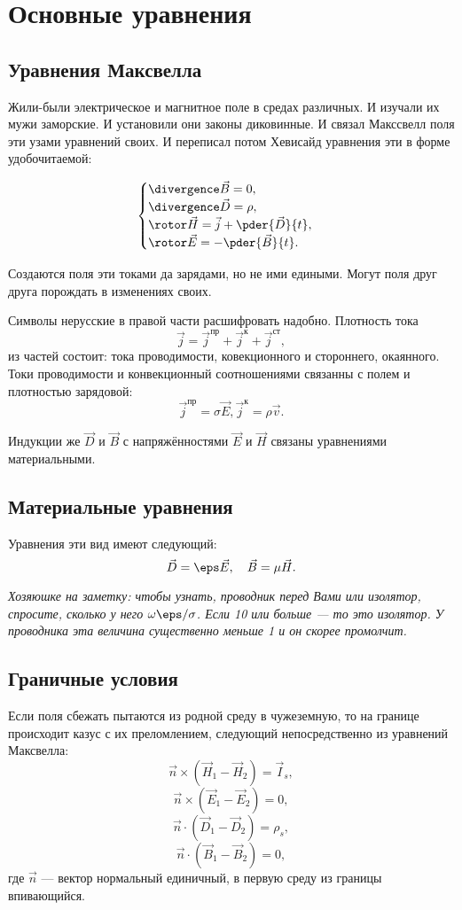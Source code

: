 \chapter{Основные уравнения}
\section{Уравнения Максвелла}
  Жили-были электрическое и магнитное поле в средах различных. И изучали их мужи
  заморские. И установили они законы диковинные. И связал Макссвелл поля эти
  узами уравнений своих. И переписал потом Хевисайд уравнения эти в форме
  удобочитаемой:

  \[
    \begin{cases}
      \divergence\vec{B} = 0,\\
      \divergence\vec{D} = \rho,\\
      \rotor\vec{H} = \vec{j} + \pder{\vec{D}}{t},\\
      \rotor\vec{E} = -\pder{\vec{B}}{t}.
    \end{cases}
  \]

  Создаются поля эти токами да зарядами, но не ими едиными. Могут поля друг
  друга порождать в изменениях своих.

  Символы нерусские в правой части расшифровать надобно. Плотность тока
  \[
      \vec{j} = \vec{j}^\text{пр} + \vec{j}^\text{к} + \vec{j}^\text{ст},
  \]
  из частей состоит: тока проводимости, ковекционного и стороннего, окаянного.
  Токи проводимости и конвекционный соотношениями связанны с полем и плотностью
  зарядовой:
  \[
      \vec{j}^\text{пр} = \sigma\vec{E}, \vec{j}^\text{к} = \rho\vec{v}.
  \]

  Индукции же \( \vec{D} \) и \( \vec{B} \) с напряжённостями \( \vec{E} \) и
  \( \vec{H} \) связаны уравнениями материальными.

\section{Материальные уравнения}
  Уравнения эти вид имеют следующий:
  \[
      \vec{D} = \eps\vec{E},\quad
      \vec{B} = \mu\vec{H}.
  \]
    
  \textit{Хозяюшке на заметку: чтобы узнать, проводник перед Вами или изолятор,
  спросите, сколько у него \(\omega\eps/\sigma\). Если 10 или больше ---
  то это изолятор. У проводника эта величина существенно меньше 1 и он скорее
  промолчит.}

\section{Граничные условия}
  Если поля сбежать пытаются из родной среду в чужеземную, то на границе
  происходит казус с их преломлением, следующий непосредственно из уравнений
  Максвелла:
  \[
    \vec{n}\times(\vec{H}_1 - \vec{H}_2) = \vec{I}_s,
  \]
  \[
    \vec{n}\times(\vec{E}_1 - \vec{E}_2) = 0,
  \]
  \[
    \vec{n}\cdot(\vec{D}_1 - \vec{D}_2) = \rho_s,
  \]
  \[
    \vec{n}\cdot(\vec{B}_1 - \vec{B}_2) = 0,
  \]
  где \(\vec{n}\) --- вектор нормальный единичный, в первую среду из границы
  впивающийся.

